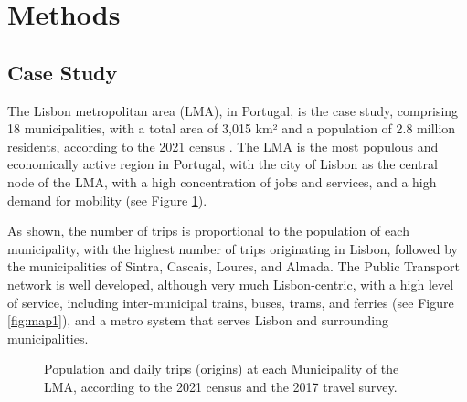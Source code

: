 \documentclass[review, doubleblind, 3p,
authoryear]{elsarticle} %
\begin{document}
\section{Methods}\label{methods}

\subsection{Case Study}\label{case-study}

The Lisbon metropolitan area (LMA), in Portugal, is the case study,
comprising 18 municipalities, with a total area of 3,015 km² and a
population of 2.8 million residents, according to the 2021 census
\citep{INEcensus}. The LMA is the most populous and economically active
region in Portugal, with the city of Lisbon as the central node of the
LMA, with a high concentration of jobs and services, and a high demand
for mobility (see Figure \ref{fig:lma}).

As shown, the number of trips is proportional to the population of each
municipality, with the highest number of trips originating in Lisbon,
followed by the municipalities of Sintra, Cascais, Loures, and Almada.
The Public Transport network is well developed, although very much
Lisbon-centric, with a high level of service, including inter-municipal
trains, buses, trams, and ferries (see Figure \ref{fig:map1}), and a
metro system that serves Lisbon and surrounding municipalities.

\begin{figure}
\caption{\label{lma}Population and daily trips (origins) at each Municipality of the LMA, according to the 2021 census and the 2017 travel survey.}\label{fig:lma}
\end{figure}
\end{document}
